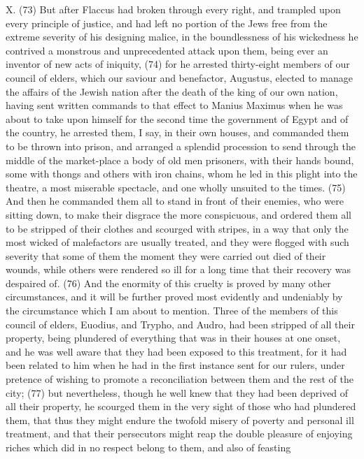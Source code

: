 X. (73) But after Flaccus had broken through every right, and trampled upon every principle of
justice, and had left no portion of the Jews free from the extreme severity of his designing malice,
in the boundlessness of his wickedness he contrived a monstrous and unprecedented attack upon
them, being ever an inventor of new acts of iniquity, (74) for he arrested thirty-eight members of
our council of elders, which our saviour and benefactor, Augustus, elected to manage the affairs of
the Jewish nation after the death of the king of our own nation, having sent written commands to
that effect to Manius Maximus when he was about to take upon himself for the second time the
government of Egypt and of the country, he arrested them, I say, in their own houses, and
commanded them to be thrown into prison, and arranged a splendid procession to send through
the middle of the market-place a body of old men prisoners, with their hands bound, some with
thongs and others with iron chains, whom he led in this plight into the theatre, a most miserable
spectacle, and one wholly unsuited to the times. (75) And then he commanded them all to stand in
front of their enemies, who were sitting down, to make their disgrace the more conspicuous, and
ordered them all to be stripped of their clothes and scourged with stripes, in a way that only the
most wicked of malefactors are usually treated, and they were flogged with such severity that some
of them the moment they were carried out died of their wounds, while others were rendered so ill
for a long time that their recovery was despaired of. (76) And the enormity of this cruelty is proved
by many other circumstances, and it will be further proved most evidently and undeniably by the
circumstance which I am about to mention. Three of the members of this council of elders,
Euodius, and Trypho, and Audro, had been stripped of all their property, being plundered of
everything that was in their houses at one onset, and he was well aware that they had been
exposed to this treatment, for it had been related to him when he had in the first instance sent for
our rulers, under pretence of wishing to promote a reconciliation between them and the rest of the
city; (77) but nevertheless, though he well knew that they had been deprived of all their property, he
scourged them in the very sight of those who had plundered them, that thus they might endure the
twofold misery of poverty and personal ill treatment, and that their persecutors might reap the
double pleasure of enjoying riches which did in no respect belong to them, and also of feasting

